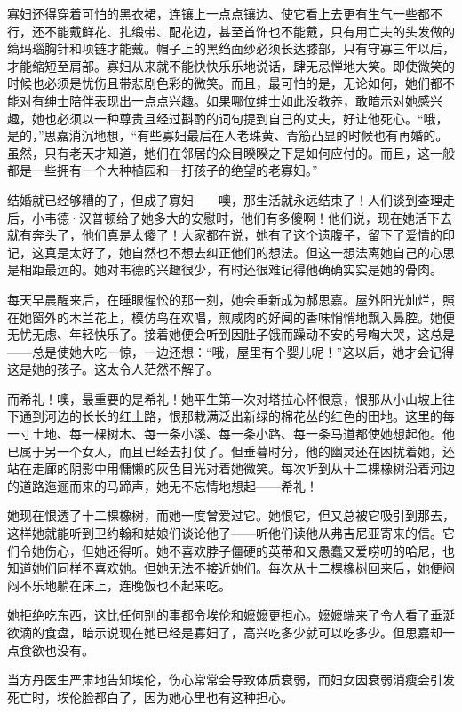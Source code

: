 \par 寡妇还得穿着可怕的黑衣裙，连镶上一点点镶边、使它看上去更有生气一些都不行，还不能戴鲜花、扎缎带、配花边，甚至首饰也不能戴，只有用亡夫的头发做的缟玛瑙胸针和项链才能戴。帽子上的黑绉面纱必须长达膝部，只有守寡三年以后，才能缩短至肩部。寡妇从来就不能快快乐乐地说话，肆无忌惮地大笑。即使微笑的时候也必须是忧伤且带悲剧色彩的微笑。而且，最可怕的是，无论如何，她们都不能对有绅士陪伴表现出一点点兴趣。如果哪位绅士如此没教养，敢暗示对她感兴趣，她也必须以一种尊贵且经过斟酌的词句提到自己的丈夫，好让他死心。“哦，是的，”思嘉消沉地想，“有些寡妇最后在人老珠黄、青筋凸显的时候也有再婚的。虽然，只有老天才知道，她们在邻居的众目睽睽之下是如何应付的。而且，这一般都是一些拥有一个大种植园和一打孩子的绝望的老寡妇。”
\par 结婚就已经够糟的了，但成了寡妇——噢，那生活就永远结束了！人们谈到查理走后，小韦德·汉普顿给了她多大的安慰时，他们有多傻啊！他们说，现在她活下去就有奔头了，他们真是太傻了！大家都在说，她有了这个遗腹子，留下了爱情的印记，这真是太好了，她自然也不想去纠正他们的想法。但这一想法离她自己的心思是相距最远的。她对韦德的兴趣很少，有时还很难记得他确确实实是她的骨肉。
\par 每天早晨醒来后，在睡眼惺忪的那一刻，她会重新成为郝思嘉。屋外阳光灿烂，照在她窗外的木兰花上，模仿鸟在欢唱，煎咸肉的好闻的香味悄悄地飘入鼻腔。她便无忧无虑、年轻快乐了。接着她便会听到因肚子饿而躁动不安的号啕大哭，这总是——总是使她大吃一惊，一边还想：“哦，屋里有个婴儿呢！”这以后，她才会记得这是她的孩子。这太令人茫然不解了。
\par 而希礼！噢，最重要的是希礼！她平生第一次对塔拉心怀恨意，恨那从小山坡上往下通到河边的长长的红土路，恨那栽满泛出新绿的棉花丛的红色的田地。这里的每一寸土地、每一棵树木、每一条小溪、每一条小路、每一条马道都使她想起他。他已属于另一个女人，而且已经去打仗了。但垂暮时分，他的幽灵还在困扰着她，还站在走廊的阴影中用慵懒的灰色目光对着她微笑。每次听到从十二棵橡树沿着河边的道路迤逦而来的马蹄声，她无不忘情地想起——希礼！
\par 她现在恨透了十二棵橡树，而她一度曾爱过它。她恨它，但又总被它吸引到那去，这样她就能听到卫约翰和姑娘们谈论他了——听他们读他从弗吉尼亚寄来的信。它们令她伤心，但她还得听。她不喜欢脖子僵硬的英蒂和又愚蠢又爱唠叨的哈尼，也知道她们同样不喜欢她。但她无法不接近她们。每次从十二棵橡树回来后，她便闷闷不乐地躺在床上，连晚饭也不起来吃。
\par 她拒绝吃东西，这比任何别的事都令埃伦和嬷嬷更担心。嬷嬷端来了令人看了垂涎欲滴的食盘，暗示说现在她已经是寡妇了，高兴吃多少就可以吃多少。但思嘉却一点食欲也没有。
\par 当方丹医生严肃地告知埃伦，伤心常常会导致体质衰弱，而妇女因衰弱消瘦会引发死亡时，埃伦脸都白了，因为她心里也有这种担心。
